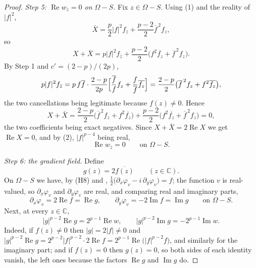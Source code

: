 \begin{proof}
\emph{Step 5: $\operatorname{Re}w_{\bar z}=0$ on $\Omega-S$.}  Fix $z\in\Omega-S$.
Using (1) and the reality of $|f|^2$,
\[
  \bar X=\frac p2|f|^2f_{\bar z}+\frac{p-2}{2}\overline{f}^{\,2}f_z ,
\]
so
\[
  X+\bar X=p|f|^2f_{\bar z}
    +\frac{p-2}{2}\bigl(f^2\overline{f_z}+\overline{f}^{\,2}f_z\bigr).
\]
By Step 1 and $c'=(2-p)/(2p)$,
\[
  p|f|^2f_{\bar z}
  =p\,f\overline{f}\cdot\frac{2-p}{2p}\Bigl[\frac{\overline{f}}{f}f_z
    +\frac{f}{\overline{f}}\overline{f_z}\Bigr]
  =\frac{2-p}{2}\bigl(\overline{f}^{\,2}f_z+f^2\overline{f_z}\bigr),
\]
the two cancellations being legitimate because $f(z)\neq0$.  Hence
\[
  X+\bar X=\frac{2-p}{2}\bigl(\overline{f}^{\,2}f_z+f^2\overline{f_z}\bigr)
    +\frac{p-2}{2}\bigl(f^2\overline{f_z}+\overline{f}^{\,2}f_z\bigr)=0,
\]
the two coefficients being exact negatives.  Since $X+\bar X=2\operatorname{Re}X$
we get $\operatorname{Re}X=0$, and by (2), $|f|^{p-4}$ being real,
\begin{equation}\tag{3}
  \operatorname{Re}w_{\bar z}=0\qquad\text{on }\Omega-S .
\end{equation}

\emph{Step 6: the gradient field.}  Define
\[
  g(z)=2\overline{f(z)}\qquad(z\in\mathbb{C}).
\]
On $\Omega-S$ we have, by (H8) and ,
$\tfrac12\bigl(\partial_x\varphi_v-i\,\partial_y\varphi_v\bigr)=f$; the function
$v$ is real-valued, so $\partial_x\varphi_v$ and $\partial_y\varphi_v$ are
real, and comparing real and imaginary parts,
\begin{equation}\tag{4}
  \partial_x\varphi_v=2\operatorname{Re}f=\operatorname{Re}g,\qquad
  \partial_y\varphi_v=-2\operatorname{Im}f=\operatorname{Im}g
  \qquad\text{on }\Omega-S .
\end{equation}
Next, at every $z\in\mathbb{C}$,
\begin{equation}\tag{5}
  |g|^{p-2}\operatorname{Re}g=2^{p-1}\operatorname{Re}w,\qquad
  |g|^{p-2}\operatorname{Im}g=-2^{p-1}\operatorname{Im}w .
\end{equation}
Indeed, if $f(z)\neq0$ then $|g|=2|f|\neq0$ and
$|g|^{p-2}\operatorname{Re}g=2^{p-2}|f|^{p-2}\cdot2\operatorname{Re}f
=2^{p-1}\operatorname{Re}\bigl(|f|^{p-2}f\bigr)$, and similarly for the
imaginary part; and if $f(z)=0$ then $g(z)=0$, so both sides of each identity
vanish, the left ones because the factors $\operatorname{Re}g$ and
$\operatorname{Im}g$ do.


\end{proof}
